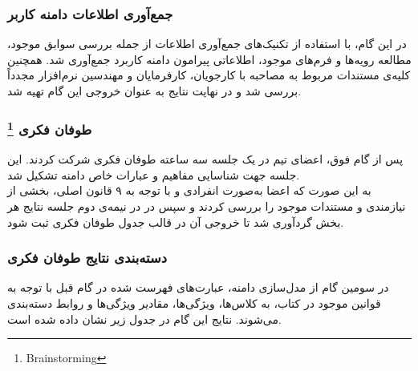 \documentclass[12pt]{article}
\begin{document}
	\subsubsection{جمع‌آوری اطلاعات دامنه کاربر}
	در این گام، با استفاده از تکنیک‌های جمع‌آوری اطلاعات از جمله بررسی سوابق موجود، مطالعه رویه‌ها و فرم‌های موجود، اطلاعاتی پیرامون دامنه کاربرد جمع‌آوری شد. همچنین کلیه‌ی مستندات مربوط به مصاحبه با کارجویان‌‌، کارفرمایان و مهندسین نرم‌افزار مجدداً بررسی شد و در نهایت نتایج به عنوان خروجی این گام تهیه شد.

	\subsubsection{طوفان فکری \footnote{Brainstorming}}
	پس از گام فوق، اعضای تیم در یک جلسه سه ساعته طوفان فکری شرکت کردند. این جلسه جهت شناسایی مفاهیم و عبارات خاص دامنه تشکیل شد.\\
	به این صورت که اعضا به‌صورت انفرادی و با توجه به ۹ قانون اصلی، بخشی از نیازمندی و مستندات موجود را بررسی کردند و سپس در در نیمه‌ی دوم جلسه نتایج هر بخش گردآوری شد تا خروجی آن در قالب جدول طوفان فکری ثبت شود.

	\subsubsection{دسته‌بندی نتایج طوفان فکری}
	در سومین گام از مدل‌سازی دامنه، عبارت‌های فهرست شده در گام قبل با توجه به قوانین موجود در کتاب، به کلاس‌ها، ویژگی‌ها، مقادیر ویژگی‌ها و روابط دسته‌بندی می‌شوند.
	نتایج این گام در جدول زیر نشان داده شده است.
\end{document}
